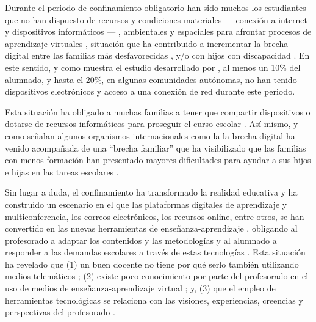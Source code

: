 \documentclass{textolivre}
\begin{document}
Durante el periodo de confinamiento obligatorio han sido muchos los estudiantes que no han dispuesto de recursos y condiciones materiales — conexión a internet y dispositivos informáticos — \cite{menendez2020, rogero2020}, %
ambientales y espaciales para afrontar procesos de aprendizaje virtuales \cite{fernandez2020, murillo2020}, %
situación que ha contribuido a incrementar la brecha digital entre las familias más desfavorecidas \cite{albala2020, sadio2020}, %
y/o con hijos con discapacidad \cite{berastegui2020}. %
En este sentido, y como muestra el estudio desarrollado por \textcite{cabreraperez2020}, %
al menos un 10\% del alumnado, y hasta el 20\%, en algunas comunidades autónomas, no han tenido dispositivos electrónicos y acceso a una conexión de red durante este periodo. 

Esta situación ha obligado a muchas familias a tener que compartir dispositivos o dotarse de recursos informáticos para proseguir el curso escolar \cite{munoz2020}. %
Así mismo, y como señalan algunos organismos internacionales como la 
\textcite{unesco2016,unicef2020,ocde2020}
la brecha digital ha venido acompañada de una “brecha familiar” que ha visibilizado que las familias con menos formación han presentado mayores dificultades para ayudar a sus hijos e hijas en las tareas escolares \cite{cabrera2020}. %

Sin lugar a duda, el confinamiento ha transformado la realidad educativa y ha construido un escenario en el que las plataformas digitales de aprendizaje y multiconferencia, los correos electrónicos, los recursos online, entre otros, se han convertido en las nuevas herramientas de enseñanza-aprendizaje \cite{menendez2020}, %
obligando al profesorado a adaptar los contenidos y las metodologías y al alumnado a responder a las demandas escolares a través de estas tecnologías \cite{rogero2020}. %
Esta situación ha revelado que (1) un buen docente no tiene por qué serlo también utilizando medios telemáticos \cite{fernandezdomingues2020}; %
(2) existe poco conocimiento por parte del profesorado en el uso de medios de enseñanza-aprendizaje virtual \cite{rogero2020}; %
y, (3) que el empleo de herramientas tecnológicas se relaciona con las visiones, experiencias, creencias y perspectivas del profesorado \cite{marin2020}. %
\end{document}
